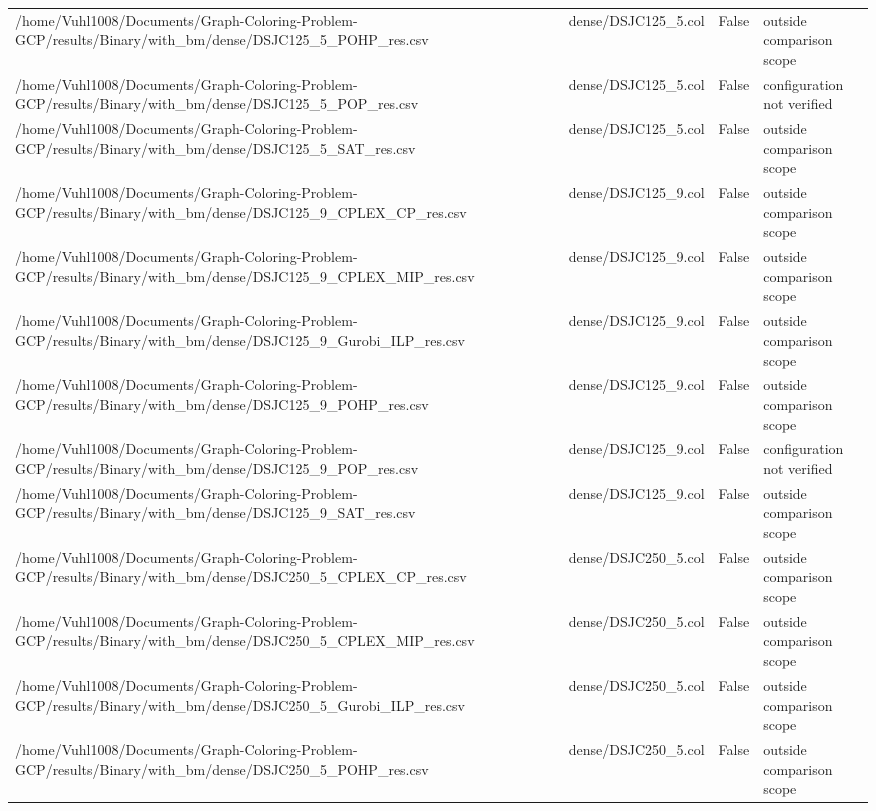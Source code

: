 \begin{table}[htbp]
\begin{tabular}{llll}
/home/Vuhl1008/Documents/Graph-Coloring-Problem-GCP/results/Binary/with\_bm/dense/DSJC125\_5\_POHP\_res.csv & dense/DSJC125\_5.col & False & outside comparison scope \\
/home/Vuhl1008/Documents/Graph-Coloring-Problem-GCP/results/Binary/with\_bm/dense/DSJC125\_5\_POP\_res.csv & dense/DSJC125\_5.col & False & configuration not verified \\
/home/Vuhl1008/Documents/Graph-Coloring-Problem-GCP/results/Binary/with\_bm/dense/DSJC125\_5\_SAT\_res.csv & dense/DSJC125\_5.col & False & outside comparison scope \\
/home/Vuhl1008/Documents/Graph-Coloring-Problem-GCP/results/Binary/with\_bm/dense/DSJC125\_9\_CPLEX\_CP\_res.csv & dense/DSJC125\_9.col & False & outside comparison scope \\
/home/Vuhl1008/Documents/Graph-Coloring-Problem-GCP/results/Binary/with\_bm/dense/DSJC125\_9\_CPLEX\_MIP\_res.csv & dense/DSJC125\_9.col & False & outside comparison scope \\
/home/Vuhl1008/Documents/Graph-Coloring-Problem-GCP/results/Binary/with\_bm/dense/DSJC125\_9\_Gurobi\_ILP\_res.csv & dense/DSJC125\_9.col & False & outside comparison scope \\
/home/Vuhl1008/Documents/Graph-Coloring-Problem-GCP/results/Binary/with\_bm/dense/DSJC125\_9\_POHP\_res.csv & dense/DSJC125\_9.col & False & outside comparison scope \\
/home/Vuhl1008/Documents/Graph-Coloring-Problem-GCP/results/Binary/with\_bm/dense/DSJC125\_9\_POP\_res.csv & dense/DSJC125\_9.col & False & configuration not verified \\
/home/Vuhl1008/Documents/Graph-Coloring-Problem-GCP/results/Binary/with\_bm/dense/DSJC125\_9\_SAT\_res.csv & dense/DSJC125\_9.col & False & outside comparison scope \\
/home/Vuhl1008/Documents/Graph-Coloring-Problem-GCP/results/Binary/with\_bm/dense/DSJC250\_5\_CPLEX\_CP\_res.csv & dense/DSJC250\_5.col & False & outside comparison scope \\
/home/Vuhl1008/Documents/Graph-Coloring-Problem-GCP/results/Binary/with\_bm/dense/DSJC250\_5\_CPLEX\_MIP\_res.csv & dense/DSJC250\_5.col & False & outside comparison scope \\
/home/Vuhl1008/Documents/Graph-Coloring-Problem-GCP/results/Binary/with\_bm/dense/DSJC250\_5\_Gurobi\_ILP\_res.csv & dense/DSJC250\_5.col & False & outside comparison scope \\
/home/Vuhl1008/Documents/Graph-Coloring-Problem-GCP/results/Binary/with\_bm/dense/DSJC250\_5\_POHP\_res.csv & dense/DSJC250\_5.col & False & outside comparison scope \\

\end{tabular}
\end{table}
